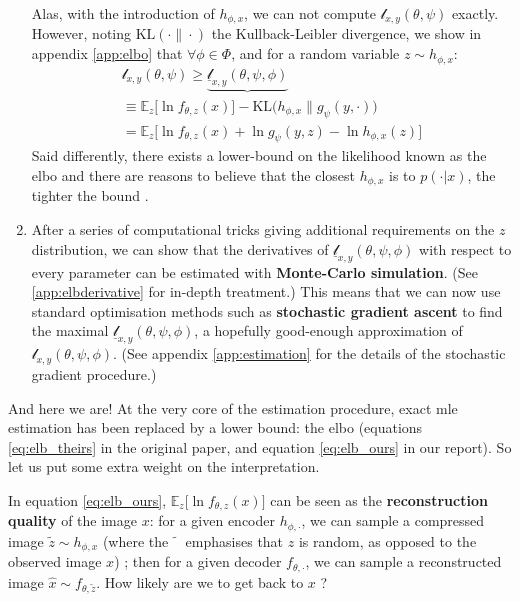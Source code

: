 \documentclass{article}
\begin{document}
\begin{multicols}{2}
\begin{enumerate}
    Alas, with the introduction of $h_{\phi,x}$, we can not compute $\mathscr{l}_{x,y}(\theta,\psi)$ exactly. However, noting $\textrm{KL}(\cdot \| \cdot )$ the Kullback-Leibler divergence, we show in appendix \ref{app:elbo} that $\forall \phi \in \Phi$, and for a random variable $z\sim h_{\phi,x}$:
    \begin{equation}
    \begin{aligned} 
    \label{eq:elb_ours} \mathscr{l}_{x,y}(\theta,\psi) \geqslant \underbrace{\underline{\mathscr{l}}_{x,y}(\theta,\psi,\phi)}{} \\ \equiv \mathbb{E}_z \Big[\ln f_{\theta,z}(x)\Big] - \textrm{KL}\Big( h_{\phi,x} \| g_\psi(y,\cdot) \Big) \\ =\mathbb{E}_z \Big[\ln f_{\theta,z}(x)+\ln g_\psi(y,z) -\ln h_{\phi,x}(z)\Big]
    \end{aligned}
    \end{equation}
    Said differently, there exists a lower-bound on the likelihood known as the \gls{elbo} and there are reasons to believe that the closest $h_{\phi,x}$ is to $p(\cdot|x)$, the tighter the bound \citep{probml-advanced}. %
    
    \item After a series of computational tricks giving additional requirements on the $z$ distribution, we can show that the derivatives of $\underline{\mathscr{l}}_{x,y}(\theta,\psi,\phi)$ with respect to every parameter can be estimated with \textbf{Monte-Carlo simulation}. (See \ref{app:elbderivative} for in-depth treatment.) This means that we can now use standard optimisation methods such as \textbf{stochastic gradient ascent} to find the maximal $\underline{\mathscr{l}}_{x,y}(\theta,\psi,\phi)$, a hopefully good-enough approximation of $\mathscr{l}_{x,y}(\theta,\psi,\phi)$. (See appendix  \ref{app:estimation} for the details of the stochastic gradient procedure.)
\end{enumerate}

And here we are! At the very core of the estimation procedure, exact \gls{mle} estimation has been replaced by a lower bound: the \gls{elbo} (equations \ref{eq:elb_theirs} in the original paper, and equation \ref{eq:elb_ours} in our report). So let us put some extra weight on the interpretation.

In equation \ref{eq:elb_ours}, $\mathbb{E}_z \Big[\ln f_{\theta,z}(x)\Big]$ can be seen as the \textbf{reconstruction quality} of the image $x$: for a given encoder $h_{\phi,\cdot}$,  we can sample a compressed image $\tilde z\sim h_{\phi,x}$ (where the $\tilde{\phantom{x}}$ emphasises that $z$ is random, as opposed to the observed image $x$) ; then for a given decoder $f_{\theta,\cdot}$, we can sample a reconstructed image $\hat x\sim f_{\theta,\tilde z}$. How likely are we to get back to $x$ ?


\end{multicols}
\end{document}
